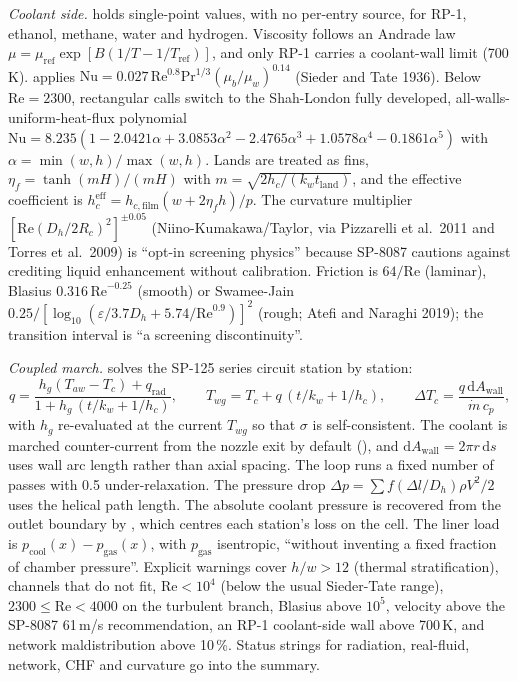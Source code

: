 \emph{Coolant side.}  holds single-point values, with no per-entry source, for RP-1, ethanol, methane, water and hydrogen. Viscosity follows an Andrade law $\mu = \mu_{\mathrm{ref}}\exp[B(1/T-1/T_{\mathrm{ref}})]$, and only RP-1 carries a coolant-wall limit (700\,K).  applies $\mathrm{Nu} = 0.027\,\mathrm{Re}^{0.8}\mathrm{Pr}^{1/3}(\mu_b/\mu_w)^{0.14}$ (Sieder and Tate 1936). Below $\mathrm{Re} = 2300$, rectangular calls switch to the Shah-London fully developed, all-walls-uniform-heat-flux polynomial $\mathrm{Nu} = 8.235(1-2.0421\alpha+3.0853\alpha^2-2.4765\alpha^3+1.0578\alpha^4-0.1861\alpha^5)$ with $\alpha = \min(w,h)/\max(w,h)$. Lands are treated as fins, $\eta_f = \tanh(mH)/(mH)$ with $m = \sqrt{2h_c/(k_w t_{\mathrm{land}})}$, and the effective coefficient is $h_c^{\mathrm{eff}} = h_{c,\mathrm{film}}(w + 2\eta_f h)/p$. The curvature multiplier $[\mathrm{Re}(D_h/2R_c)^2]^{\pm0.05}$ (Niino-Kumakawa/Taylor, via Pizzarelli et al.\ 2011 and Torres et al.\ 2009) is ``opt-in screening physics'' because SP-8087 cautions against crediting liquid enhancement without calibration. Friction is $64/\mathrm{Re}$ (laminar), Blasius $0.316\,\mathrm{Re}^{-0.25}$ (smooth) or Swamee-Jain $0.25/[\log_{10}(\varepsilon/3.7D_h + 5.74/\mathrm{Re}^{0.9})]^2$ (rough; Atefi and Naraghi 2019); the transition interval is ``a screening discontinuity''.

\emph{Coupled march.}  solves the SP-125 series circuit station by station:
\[
q = \frac{h_g(T_{aw}-T_c) + q_{\mathrm{rad}}}{1 + h_g\,(t/k_w + 1/h_c)},\qquad T_{wg} = T_c + q\,(t/k_w + 1/h_c),\qquad \Delta T_c = \frac{q\,\mathrm{d}A_{\mathrm{wall}}}{\dot m\,c_p},
\]
with $h_g$ re-evaluated at the current $T_{wg}$ so that $\sigma$ is self-consistent. The coolant is marched counter-current from the nozzle exit by default (), and $\mathrm{d}A_{\mathrm{wall}} = 2\pi r\,\mathrm{d}s$ uses wall arc length rather than axial spacing. The loop runs a fixed number of passes with 0.5 under-relaxation. The pressure drop $\Delta p = \sum f(\Delta l/D_h)\rho V^2/2$ uses the helical path length. The absolute coolant pressure is recovered from the outlet boundary by , which centres each station's loss on the cell. The liner load is $p_{\mathrm{cool}}(x) - p_{\mathrm{gas}}(x)$, with $p_{\mathrm{gas}}$ isentropic, ``without inventing a fixed fraction of chamber pressure''. Explicit warnings cover $h/w > 12$ (thermal stratification), channels that do not fit, $\mathrm{Re} < 10^4$ (below the usual Sieder-Tate range), $2300 \leq \mathrm{Re} < 4000$ on the turbulent branch, Blasius above $10^5$, velocity above the SP-8087 61\,m/s recommendation, an RP-1 coolant-side wall above 700\,K, and network maldistribution above 10\,\%. Status strings for radiation, real-fluid, network, CHF and curvature go into the summary.

